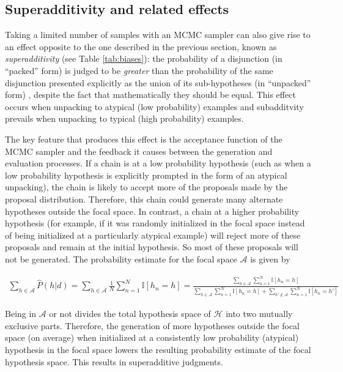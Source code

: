 \subsection{Superadditivity and related effects}

Taking a limited number of samples with an MCMC sampler can also give rise to an effect opposite to the one described in the previous section, known as \emph{superadditivity} (see Table \ref{tab:biases}): the probability of a disjunction (in ``packed'' form) is judged to be \textit{greater} than the probability of the same disjunction presented explicitly as the union of its sub-hypotheses (in ``unpacked'' form) \citep{super,hadjichristidis1999opening}, despite the fact that mathematically they should be equal. This effect occurs when unpacking to atypical (low probability) examples and subadditvity prevails when unpacking to typical (high probability) examples.

The key feature that produces this effect is the acceptance function of the MCMC sampler and the feedback it causes between the generation and evaluation processes. If a chain is at a low probability hypothesis (such as when a low probability hypothesis is explicitly prompted in the form of an atypical unpacking), the chain is likely to accept more of the proposals made by the proposal distribution. Therefore, this chain could generate many alternate hypotheses outside the focal space. In contrast, a chain at a higher probability hypothesis (for example, if it was randomly initialized in the focal space instead of being initialized at a particularly atypical example) will reject more of these proposals and remain at the initial hypothesis. So most of these proposals will not be generated. The probability estimate for the focal space $\mathcal{A}$ is given by 

\begin{align}
\sum_{h \in \mathcal{A}} \hat{P}(h | d) = 
\sum_{h \in \mathcal{A}}\frac{1}{N}\sum_{n=1}^N \mathbb{I}[h_n=h] = 
\frac{\sum_{h \in \mathcal{A}} \sum_{n=1}^N \mathbb{I}[h_n=h]}
{\sum_{h \in \mathcal{A}} \sum_{n=1}^N \mathbb{I}[h_n=h] + \sum_{h' \notin \mathcal{A}} \sum_{n=1}^N \mathbb{I}[h_n=h']}
\end{align}

Being in $\mathcal{A}$ or not divides the total hypothesis space of $\mathcal{H}$ into two mutually exclusive parts. Therefore, the generation of more hypotheses outside the focal space (on average) when initialized at a consistently low probability (atypical) hypothesis in the focal space lowers the resulting probability estimate of the focal hypothesis space. This results in superadditive judgments.
 
